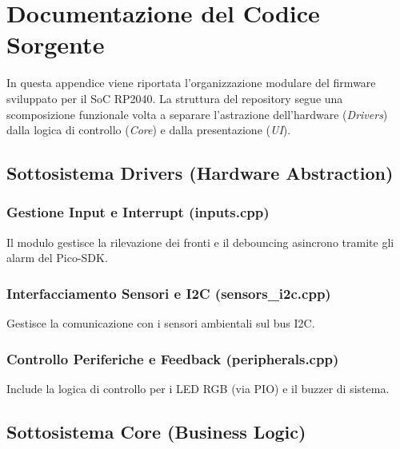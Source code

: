 
\section{Documentazione del Codice Sorgente}
\label{appendix:firmware}

In questa appendice viene riportata l'organizzazione modulare del firmware sviluppato per il SoC RP2040. La struttura del repository segue una scomposizione funzionale volta a separare l'astrazione dell'hardware (\textit{Drivers}) dalla logica di controllo (\textit{Core}) e dalla presentazione (\textit{UI}).


\subsection{Sottosistema Drivers (Hardware Abstraction)}

\subsubsection{Gestione Input e Interrupt (inputs.cpp)}
Il modulo gestisce la rilevazione dei fronti e il debouncing asincrono tramite gli alarm del Pico-SDK.


\subsubsection{Interfacciamento Sensori e I2C (sensors\_i2c.cpp)}
Gestisce la comunicazione con i sensori ambientali sul bus I2C.


\subsubsection{Controllo Periferiche e Feedback (peripherals.cpp)}
Include la logica di controllo per i LED RGB (via PIO) e il buzzer di sistema.


\subsection{Sottosistema Core (Business Logic)}

